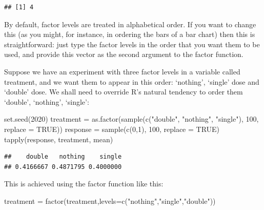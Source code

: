 \documentclass[
]{book}
\newenvironment{Shaded}{\begin{snugshade}}{\end{snugshade}}
\newcommand{\AttributeTok}[1]{\textcolor[rgb]{0.77,0.63,0.00}{#1}}
\newcommand{\ConstantTok}[1]{\textcolor[rgb]{0.00,0.00,0.00}{#1}}
\newcommand{\DecValTok}[1]{\textcolor[rgb]{0.00,0.00,0.81}{#1}}
\newcommand{\FunctionTok}[1]{\textcolor[rgb]{0.00,0.00,0.00}{#1}}
\newcommand{\NormalTok}[1]{#1}
\newcommand{\OtherTok}[1]{\textcolor[rgb]{0.56,0.35,0.01}{#1}}
\newcommand{\StringTok}[1]{\textcolor[rgb]{0.31,0.60,0.02}{#1}}
\theoremstyle{definition}
\theoremstyle{definition}
\theoremstyle{definition}
\theoremstyle{definition}
\theoremstyle{remark}
\begin{document}
\begin{verbatim}
## [1] 4
\end{verbatim}

By default, factor levels are treated in alphabetical order. If you want to change this (as you might, for instance, in ordering the bars of a bar chart) then this is straightforward: just type the factor levels in the order that you want them to be used, and provide this vector as the second argument to the factor function.

Suppose we have an experiment with three factor levels in a variable called treatment, and we want them to appear in this order: `nothing', `single' dose and `double' dose. We shall need to override R's natural tendency to order them `double', `nothing', `single':

\begin{Shaded}
\begin{Highlighting}[]
\FunctionTok{set.seed}\NormalTok{(}\DecValTok{2020}\NormalTok{)}
\NormalTok{treatment }\OtherTok{=} \FunctionTok{as.factor}\NormalTok{(}\FunctionTok{sample}\NormalTok{(}\FunctionTok{c}\NormalTok{(}\StringTok{"double"}\NormalTok{, }\StringTok{"nothing"}\NormalTok{, }\StringTok{"single"}\NormalTok{), }\DecValTok{100}\NormalTok{, }\AttributeTok{replace =} \ConstantTok{TRUE}\NormalTok{))}
\NormalTok{response }\OtherTok{=} \FunctionTok{sample}\NormalTok{(}\FunctionTok{c}\NormalTok{(}\DecValTok{0}\NormalTok{,}\DecValTok{1}\NormalTok{), }\DecValTok{100}\NormalTok{, }\AttributeTok{replace =} \ConstantTok{TRUE}\NormalTok{)}
\FunctionTok{tapply}\NormalTok{(response, treatment, mean)}
\end{Highlighting}
\end{Shaded}

\begin{verbatim}
##    double   nothing    single 
## 0.4166667 0.4871795 0.4000000
\end{verbatim}

This is achieved using the factor function like this:

\begin{Shaded}
\begin{Highlighting}[]
\NormalTok{treatment }\OtherTok{=} \FunctionTok{factor}\NormalTok{(treatment,}\AttributeTok{levels=}\FunctionTok{c}\NormalTok{(}\StringTok{"nothing"}\NormalTok{,}\StringTok{"single"}\NormalTok{,}\StringTok{"double"}\NormalTok{))}
\end{Highlighting}
\end{Shaded}
\end{document}
